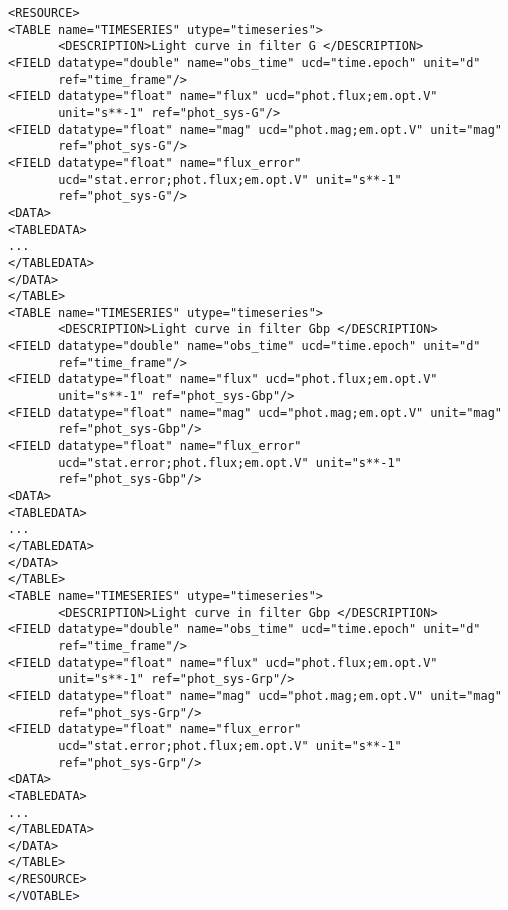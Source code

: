 \begingroup\footnotesize
\begin{tcolorbox}
\begin{verbatim}
<RESOURCE>
<TABLE name="TIMESERIES" utype="timeseries">
       <DESCRIPTION>Light curve in filter G </DESCRIPTION>
<FIELD datatype="double" name="obs_time" ucd="time.epoch" unit="d" 
       ref="time_frame"/>
<FIELD datatype="float" name="flux" ucd="phot.flux;em.opt.V" 
       unit="s**-1" ref="phot_sys-G"/>
<FIELD datatype="float" name="mag" ucd="phot.mag;em.opt.V" unit="mag"
       ref="phot_sys-G"/>
<FIELD datatype="float" name="flux_error" 
       ucd="stat.error;phot.flux;em.opt.V" unit="s**-1"
       ref="phot_sys-G"/>
<DATA>
<TABLEDATA>
...
</TABLEDATA>
</DATA>
</TABLE>
<TABLE name="TIMESERIES" utype="timeseries">
       <DESCRIPTION>Light curve in filter Gbp </DESCRIPTION>
<FIELD datatype="double" name="obs_time" ucd="time.epoch" unit="d" 
       ref="time_frame"/>
<FIELD datatype="float" name="flux" ucd="phot.flux;em.opt.V" 
       unit="s**-1" ref="phot_sys-Gbp"/>
<FIELD datatype="float" name="mag" ucd="phot.mag;em.opt.V" unit="mag"
       ref="phot_sys-Gbp"/>
<FIELD datatype="float" name="flux_error" 
       ucd="stat.error;phot.flux;em.opt.V" unit="s**-1"
       ref="phot_sys-Gbp"/>
<DATA>
<TABLEDATA>
...
</TABLEDATA>
</DATA>
</TABLE>
<TABLE name="TIMESERIES" utype="timeseries">
       <DESCRIPTION>Light curve in filter Gbp </DESCRIPTION>
<FIELD datatype="double" name="obs_time" ucd="time.epoch" unit="d" 
       ref="time_frame"/>
<FIELD datatype="float" name="flux" ucd="phot.flux;em.opt.V" 
       unit="s**-1" ref="phot_sys-Grp"/>
<FIELD datatype="float" name="mag" ucd="phot.mag;em.opt.V" unit="mag"
       ref="phot_sys-Grp"/>
<FIELD datatype="float" name="flux_error" 
       ucd="stat.error;phot.flux;em.opt.V" unit="s**-1"
       ref="phot_sys-Grp"/>
<DATA>
<TABLEDATA>
...
</TABLEDATA>
</DATA>
</TABLE>
</RESOURCE>
</VOTABLE>
\end{verbatim}
\end{tcolorbox}
\endgroup
